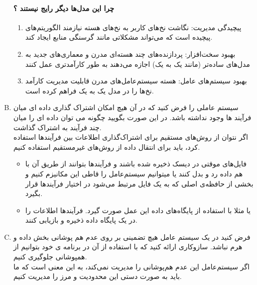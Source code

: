 \documentclass[]{article}
\begin{document}
\begin{enumerate}[(A)]
            \paragraph*{چرا این مدل‌ها دیگر رایج نیستند ؟}
            \begin{enumerate}[1.]
                  \item پیچیدگی مدیریت:
                        نگاشت نخ‌های کاربر به نخ‌های هسته نیازمند الگوریتم‌های پیچیده است که می‌تواند مشکلاتی مانند گرسنگی منابع
                        ایجاد کند.
                  \item بهبود سخت‌افزار:
                        پردازنده‌های چند هسته‌ای مدرن و معماری‌های جدید به مدل‌های ساده‌تر (مانند یک به یک) اجازه می‌دهند به طور کارآمدتری عمل کنند
                  \item بهبود سیستم‌های عامل:
                        هسته سیستم‌عامل‌های مدرن قابلیت مدیریت کارآمد نخ‌ها را در مدل یک به یک فراهم کرده است.
            \end{enumerate}
      \item ﺳﯿﺴﺘﻢ ﻋﺎﻣﻠﯽ ﺭﺍ ﻓﺮﺽ ﮐﻨﯿﺪ ﮐﻪ ﺩﺭ ﺁﻥ ﻫﯿﭻ ﺍﻣﮑﺎﻥ ﺍﺷﺘﺮﺍﮎ ﮔﺬﺍﺭﯼ ﺩﺍﺩﻩ ﺍﯼ ﻣﯿﺎﻥ ﻓﺮﺁﯾﻨﺪ ﻫﺎ ﻭﺟﻮﺩ ﻧﺪﺍﺷﺘﻪ ﺑﺎﺷﺪ. ﺩﺭ ﺍﯾﻦ ﺻﻮﺭﺕ ﺑﮕﻮﯾﯿﺪ
            ﭼﮕﻮﻧﻪ ﻣﯽ ﺗﻮﺍﻥ ﺩﺍﺩﻩ ﺍﯼ ﺭﺍ ﻣﯿﺎﻥ ﭼﻨﺪ ﻓﺮﺁﯾﻨﺪ ﺑﻪ ﺍﺷﺘﺮﺍﮎ ﮔﺬﺍﺷﺖ.
            \\
            اگر نتوان از روش‌های مستقیم برای اشتراک‌گذاری اطلاعات بین فرآیند‌ها استفاده کرد، باید برای انتقال داده از روش‌های غیرمستقیم استفاده کنیم.
            \begin{itemize}
                  \renewcommand\labelitemi{-}
                  \item فایل‌های موقتی در دیسک ذخیره شده باشند و فرآیند‌ها بتوانند از طریق آن با هم داده رد و بدل کنند
                        یا میتوانیم سیستم‌عامل را قاطی این مکانیزم کنیم و بخشی از حافظه‌ی اصلی که به یک فایل مرتبط می‌شود در اختیار فرآیند‌ها قرار بگیرد.
                  \item یا مثلا با استفاده از پایگاه‌های داده‌ این عمل صورت گیرد. فرآیند‌ها اطلاعات را در یک پایگاه داده ذخیره و بازیابی کنند.
            \end{itemize}
      \item ﻓﺮﺽ ﮐﻨﯿﺪ ﺩﺭ ﯾﮏ ﺳﯿﺴﺘﻢ ﻋﺎﻣﻞ ﻫﯿﭻ ﺗﻀﻤﯿﻨﯽ ﺑﺮ ﺭﻭﯼ ﻋﺪﻡ ﻫﻢ ﭘﻮﺷﺎﻧﯽ ﺑﺨﺶ ﺩﺍﺩﻩ ﻭ ﻫﺮﻡ ﻧﺒﺎﺷﺪ. ﺳﺎﺯﻭﮐﺎﺭﯼ ﺍﺭﺍﺋﻪ ﮐﻨﯿﺪ ﮐﻪ ﺑﺎ ﺍﺳﺘﻔﺎﺩﻩ
            ﺍﺯ ﺁﻥ ﺩﺭ ﺑﺮﻧﺎﻣﻪ ﯼ ﺧﻮﺩ ﺑﺘﻮﺍﻧﯿﻢ ﺍﺯ ﻫﻤﭙﻮﺷﺎﻧﯽ ﺟﻠﻮﮔﯿﺮﯼ ﮐﻨﯿﻢ.
            \\
            اگر سیستم‌عامل این عدم هم‌پوشانی را مدیریت نمی‌کند، به این معنی است که ما باید به صورت دستی این محدودیت و مرز را مدیریت کنیم.

\end{enumerate}
\end{document}
